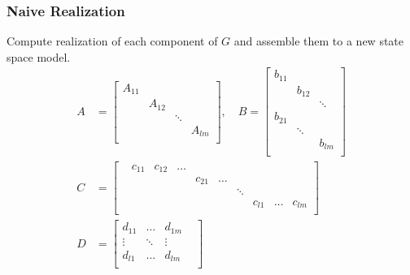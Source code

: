 \subsubsection{Naive Realization}
Compute realization of each component of $G$ and assemble them to a new state space model.
\begin{align*}
    A & =\begin{bmatrix}
             A_{11} &        &        &        \\
                    & A_{12} &        &        \\
                    &        & \ddots &        \\
                    &        &        & A_{lm} \\
         \end{bmatrix},
    \quad B  =\begin{bmatrix}
                  b_{11} &        &        \\
                         & b_{12} &        \\
                         &        & \ddots \\
                  b_{21} &        &        \\
                         & \ddots &        \\
                         &        & b_{lm} \\
              \end{bmatrix}                                                  \\
    C & =\begin{bmatrix}
              & c_{11} & c_{12} & \dots &        &       &        &        &       &        \\
              &        &        &       & c_{21} & \dots &        &        &       &        \\
              &        &        &       &        &       & \ddots &        &       &        \\
              &        &        &       &        &       &        & c_{l1} & \dots & c_{lm} \\
         \end{bmatrix} \\
    D & = \begin{bmatrix}
              d_{11} & \dots  & d_{1m}   \\
              \vdots & \ddots & \vdots & \\
              d_{l1} & \dots  & d_{lm} & \\
          \end{bmatrix}
\end{align*}

